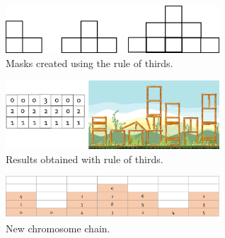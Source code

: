 \documentclass[conference]{IEEEtran}
\begin{document}
    \begin{figure}[htbp]
        \centerline{\includegraphics[width=80mm]{Images/mask_distribution.png}}
        \caption{Masks created using the rule of thirds.}
        \label{rule_of_thirds_masks}
    \end{figure}
    
    
    \begin{figure}[htbp]
        \centerline{\includegraphics[width=80mm]{Images/result_example_thirds.png}}
        \caption{Results obtained with rule of thirds.}
        \label{rule_of_thirds_result}
    \end{figure}
    
    
 
    
    
    
    \begin{figure}[htbp]
    \centerline{\includegraphics[width=80mm]{Images/chromosome_chain_new_model.png}}
    \caption{New chromosome chain.}
    \label{new_chrom}
    \end{figure}
    
\end{document}
